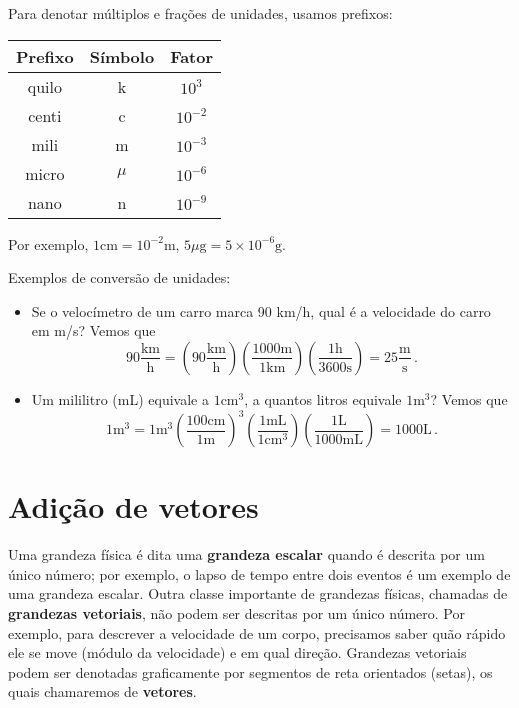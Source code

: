 \documentclass[12pt, a4paper]{article}
\newcommand{\dpar}[1]{\left(#1\right)}
\newcommand{\un}[1]{\mathrm{#1}}
\begin{document}
Para denotar múltiplos e frações de unidades, usamos prefixos:

\begin{center}
	\begin{tabular}{c|c|c}
		Prefixo&Símbolo&Fator\\\hline
		quilo&k&$10^3$\\
		centi&c&$10^{-2}$\\
		mili&m&$10^{-3}$\\
		micro&$\mu$&$10^{-6}$\\
		nano&n&$10^{-9}$
	\end{tabular}
\end{center}
Por exemplo, $1\un{cm}=10^{-2}\un{m}$, $5\mu\un{g}=5\times10^{-6}\un{g}$.

Exemplos de conversão de unidades: 
\begin{itemize}
	\item Se o velocímetro de um carro marca 90 km/h, qual é a velocidade do carro em m/s? Vemos que
	$$90 \frac{\un{km}}{\un{h}}=\dpar{90 \frac{\un{km}}{\un{h}}}\dpar{\frac{1000\un{m}}{1\un{km}}}\dpar{\frac{1\un{h}}{3600\un{s}}}=25\frac{\un{m}}{\un{s}}\,.$$
	\item Um mililitro (mL) equivale a $1\un{cm}^3$, a quantos litros equivale $1\un{m}^3$? Vemos que
	$$1\un{m}^3=1\un{m}^3\dpar{\frac{100\un{cm}}{1\un{m}}}^3\dpar{\frac{1\un{mL}}{1\un{cm}^3}}\dpar{\frac{1\un{L}}{1000\un{mL}}}=1000\un{L}\,.$$
\end{itemize}


\section{Adição de vetores}
Uma grandeza física é dita uma \textbf{grandeza escalar} quando é descrita por um único número; por exemplo, o lapso de tempo entre dois eventos é um exemplo de uma grandeza escalar. Outra classe importante de grandezas físicas, chamadas de \textbf{grandezas vetoriais}, não podem ser descritas por um único número. Por exemplo, para descrever a velocidade de um corpo, precisamos saber quão rápido ele se move (módulo da velocidade) e em qual direção. Grandezas vetoriais podem ser denotadas graficamente por segmentos de reta orientados (setas), os quais chamaremos de \textbf{vetores}.
\end{document}

